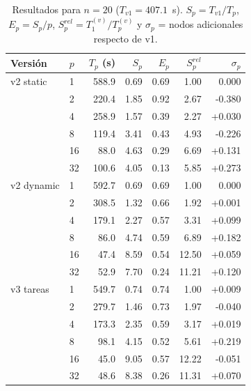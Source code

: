 \begin{table}[H]
\centering
\caption{Resultados para $n=20$ ($T_{v1} = 407.1$~s). $S_p = T_{v1}/T_p$, $E_p = S_p/p$, $S^{rel}_p = T^{(v)}_1/T^{(v)}_p$ y $\sigma_p$ = nodos adicionales respecto de v1.}
\label{tab:n20}
\small
\begin{tabular}{llrrrrr}
\toprule
Versión & $p$ & $T_p$ (s) & $S_p$ & $E_p$ & $S^{rel}_p$ & $\sigma_p$ \\
\midrule
v2 static & 1 & 588.9 & 0.69 & 0.69 & 1.00 & 0.000 \\
 & 2 & 220.4 & 1.85 & 0.92 & 2.67 & -0.380 \\
 & 4 & 258.9 & 1.57 & 0.39 & 2.27 & +0.030 \\
 & 8 & 119.4 & 3.41 & 0.43 & 4.93 & -0.226 \\
 & 16 & 88.0 & 4.63 & 0.29 & 6.69 & +0.131 \\
 & 32 & 100.6 & 4.05 & 0.13 & 5.85 & +0.273 \\
\midrule
v2 dynamic & 1 & 592.7 & 0.69 & 0.69 & 1.00 & 0.000 \\
 & 2 & 308.5 & 1.32 & 0.66 & 1.92 & +0.001 \\
 & 4 & 179.1 & 2.27 & 0.57 & 3.31 & +0.099 \\
 & 8 & 86.0 & 4.74 & 0.59 & 6.89 & +0.182 \\
 & 16 & 47.4 & 8.59 & 0.54 & 12.50 & +0.059 \\
 & 32 & 52.9 & 7.70 & 0.24 & 11.21 & +0.120 \\
\midrule
v3 tareas & 1 & 549.7 & 0.74 & 0.74 & 1.00 & +0.009 \\
 & 2 & 279.7 & 1.46 & 0.73 & 1.97 & -0.040 \\
 & 4 & 173.3 & 2.35 & 0.59 & 3.17 & +0.019 \\
 & 8 & 98.1 & 4.15 & 0.52 & 5.61 & +0.219 \\
 & 16 & 45.0 & 9.05 & 0.57 & 12.22 & -0.051 \\
 & 32 & 48.6 & 8.38 & 0.26 & 11.31 & +0.070 \\
\bottomrule
\end{tabular}
\end{table}
